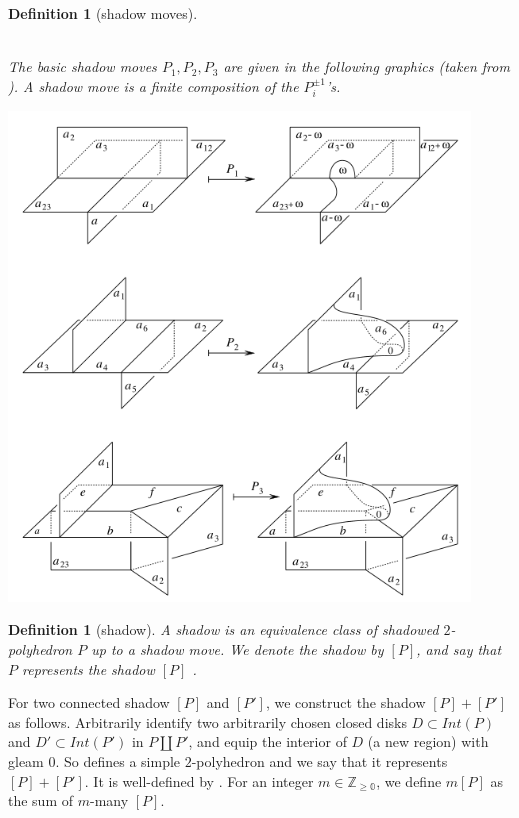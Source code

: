 \documentclass[12pt]{extarticle}
\numberwithin{equation}{section} %
\theoremstyle{mystyle}
\newtheorem{definition}[equation]{Definition}
\newcommand{\details}[1]{
    {\color{OliveGreen} #1} \\}
\begin{document}
\begin{definition}[shadow moves]\label{def/shadow-moves}
  \details{\cite[section VIII.1.3,
    p.369]{turaev-qiok-3-manifolds}} The basic shadow moves
  $P_{1}, P_{2}, P_{3}$ are given in the following graphics
  (taken from \cite{turaev-qiok-3-manifolds}). A shadow move is a
  finite composition of the $P_{i}^{\pm 1}$'s.
  \begin{center}
    \includegraphics[height=13cm]{shadow-move--taken-from-turaev}
  \end{center}
\end{definition}

\begin{definition}[shadow]\label{def/shadow}
  A shadow is an equivalence class of shadowed $2$-polyhedron $P$
  up to a shadow move. We denote the shadow by $[P]$, and say
  that $P$ represents the shadow $[P]$
  \cite[p.370]{turaev-qiok-3-manifolds}.
\end{definition}

\noindent For two connected shadow $[P]$ and $[P']$, we construct
the shadow $[P]+[P']$ as follows. Arbitrarily identify two
arbitrarily chosen closed disks $D \subset Int(P)$ and
$D' \subset Int(P')$ in $P \coprod P'$, and equip the interior of
$D$ (a new region) with gleam $0$. So defines a simple
$2$-polyhedron and we say that it represents $[P]+[P']$. It is
well-defined by \cite[lemma VIII.2.1.1]{turaev-qiok-3-manifolds}.
For an integer $m \in \mathbb{Z_{\geq 0}}$, we define $m[P]$ as
the sum of $m$-many $[P]$.
\end{document}
